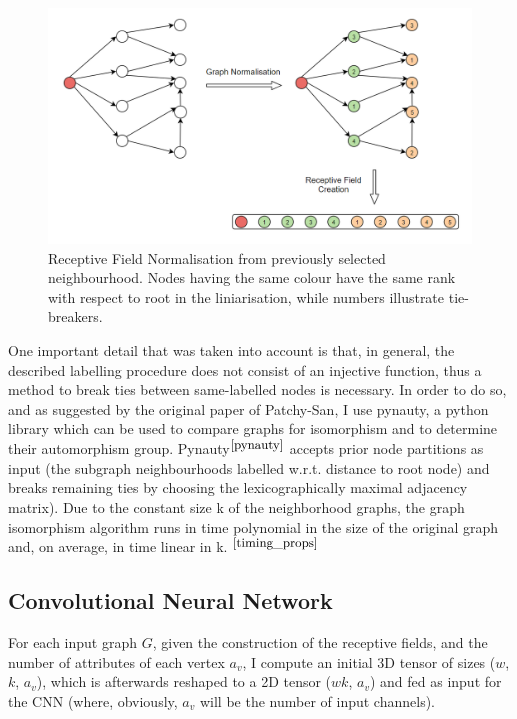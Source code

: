 \begin{figure}[H]
  \centering
  \includegraphics[scale=0.45]{Images/normalisation.png}
  \caption{Receptive Field Normalisation from previously selected neighbourhood. Nodes having the same colour have the same rank with respect to root in the liniarisation, while numbers illustrate tie-breakers.}
  \label{normalisation}
\end{figure}

One important detail that was taken into account is that, in general, the described labelling procedure does not consist of an injective function, thus a method to break ties between same-labelled nodes is necessary. In order to do so, and as suggested by the original paper of Patchy-San, I use pynauty, a python library which can be used to compare graphs for isomorphism and to determine their automorphism group. Pynauty$^{\small \cite{pynauty}}$ accepts prior node partitions as input (the subgraph neighbourhoods labelled w.r.t. distance to root node) and breaks remaining ties by choosing the lexicographically maximal adjacency matrix). Due to the constant size k of the neighborhood graphs, the graph isomorphism algorithm runs in time polynomial in the size of the original graph and, on average, in time linear in k. $^{\small \cite{timing_props}}$ \\ 

\subsection{Convolutional Neural Network}

For each input graph $G$, given the construction of the receptive fields, and the number of attributes of each vertex $a_v$, I compute an initial 3D tensor of sizes ($w$, $k$, $a_v$), which is afterwards reshaped to a 2D tensor ($wk$, $a_v$) and fed as input for the CNN (where, obviously, $a_v$ will be the number of input channels). \\

